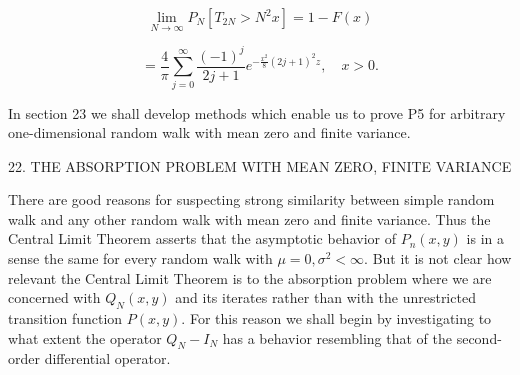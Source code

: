 $$\lim_{N \to \infty} P_N [T_{2N} > N^2 x] = 1 - F(x)$$

$$= \frac{4}{\pi} \sum_{j=0}^{\infty} \frac{(-1)^j}{2j + 1} e^{-\frac{x^2}{8}(2j + 1)^2 z}, \quad x > 0.$$

In section 23 we shall develop methods which enable us to prove P5 for arbitrary one-dimensional random walk with mean zero and finite variance.

22. THE ABSORPTION PROBLEM WITH MEAN ZERO, FINITE VARIANCE

There are good reasons for suspecting strong similarity between simple random walk and any other random walk with mean zero and finite variance. Thus the Central Limit Theorem asserts that the asymptotic behavior of $P_n(x,y)$ is in a sense the same for every random walk with $\mu = 0, \sigma^2 < \infty$. But it is not clear how relevant the Central Limit Theorem is to the absorption problem where we are concerned with $Q_N(x,y)$ and its iterates rather than with the unrestricted transition function $P(x,y)$. For this reason we shall begin by investigating to what extent the operator $Q_N - I_N$ has a behavior resembling that of the second-order differential operator.